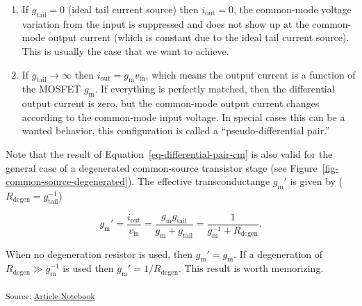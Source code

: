 \documentclass[
  a4paper,
  DIV=11,
  numbers=noendperiod]{scrartcl}
\providecommand{\tightlist}{%
  \setlength{\itemsep}{0pt}\setlength{\parskip}{0pt}}\usepackage{longtable,booktabs,array}
\begin{document}
\begin{enumerate}
\def\labelenumi{\arabic{enumi}.}
\tightlist
\item
  If \(g_\mathrm{tail} = 0\) (ideal tail current source) then
  \(i_\mathrm{out} = 0\), the common-mode voltage variation from the
  input is suppressed and does not show up at the common-mode output
  current (which is constant due to the ideal tail current source). This
  is usually the case that we want to achieve.
\item
  If \(g_\mathrm{tail} \rightarrow \infty\) then
  \(i_\mathrm{out} = g_\mathrm{m}v_\mathrm{in}\), which means the output
  current is a function of the MOSFET \(g_\mathrm{m}\). If everything is
  perfectly matched, then the differential output current is zero, but
  the common-mode output current changes according to the common-mode
  input voltage. In special cases this can be a wanted behavior, this
  configuration is called a ``pseudo-differential pair.''
\end{enumerate}

Note that the result of Equation~\ref{eq-differential-pair-cm} is also
valid for the general case of a degenerated common-source transistor
stage (see Figure~\ref{fig-common-source-degenerated}). The effective
transconductange \(g_\mathrm{m}'\) is given by
(\(R_\mathrm{degen} = g_\mathrm{tail}^{-1}\))

\[
g_\mathrm{m}' = \frac{i_\mathrm{out}}{v_\mathrm{in}} = \frac{g_\mathrm{m}g_\mathrm{tail}}{g_\mathrm{m}+ g_\mathrm{tail}} = \frac{1}{g_\mathrm{m}^{-1} + R_\mathrm{degen}}.
\]

When no degeneration resistor is used, then
\(g_\mathrm{m}' = g_\mathrm{m}\). If a degeneration of
\(R_\mathrm{degen} \gg g_\mathrm{m}^{-1}\) is used then
\(g_\mathrm{m}' = 1 / R_\mathrm{degen}\). This result is worth
memorizing.

\textsubscript{Source:
\href{https://iic-jku.github.io/analog-circuit-design/index.qmd.html}{Article
Notebook}}
\end{document}
